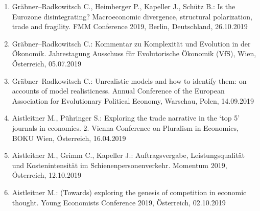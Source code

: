 \begin{enumerate}
	\item Gräbner--Radkowitsch C., Heimberger P., Kapeller J., Schütz B.: Is the Eurozone disintegrating? Macroeconomic divergence, structural polarization, trade and fragility. FMM Conference 2019, Berlin, Deutschland, 26.10.2019
	\item Gräbner--Radkowitsch C.: Kommentar zu Komplexität und Evolution in der Ökonomik. Jahrestagung Ausschuss für Evolutorische Ökonomik (VfS), Wien, Österreich, 05.07.2019
	\item Gräbner--Radkowitsch C.: Unrealistic models and how to identify them: on accounts of model realisticness. Annual Conference of the European Association for Evolutionary Political Economy, Warschau, Polen, 14.09.2019
	\item Aistleitner M., Pühringer S.: Exploring the trade narrative in the ‘top 5’ journals in economics. 2. Vienna Conference on Pluralism in Economics, BOKU Wien, Österreich, 16.04.2019
	\item Aistleitner M., Grimm C., Kapeller J.: Auftragsvergabe, Leistungsqualität und Kostenintensität im Schienenpersonenverkehr. Momentum 2019, Österreich, 12.10.2019
	\item Aistleitner M.: (Towards) exploring the genesis of competition in economic thought. Young Economists Conference 2019, Österreich, 02.10.2019
\end{enumerate}
